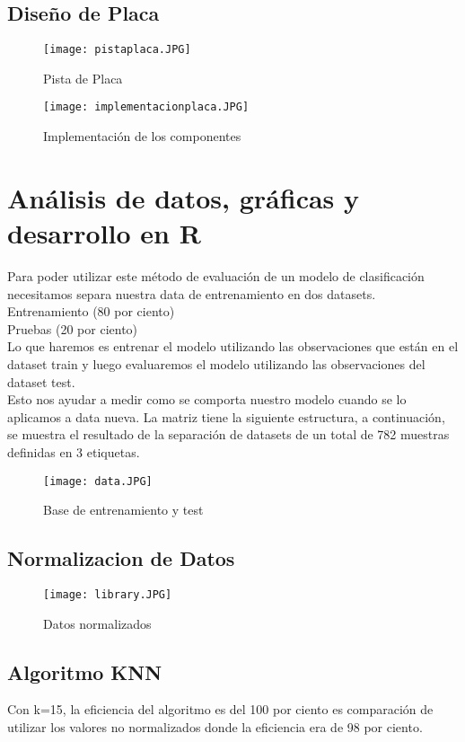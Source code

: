 \documentclass[10pt,a4paper]{article}
\begin{document}
\subsection{Diseño de Placa}

\begin{figure}[H]
\centering
\texttt{[image: pistaplaca.JPG]}
 \caption{Pista de Placa} 
\end{figure} 

\begin{figure}[H]
\centering
\texttt{[image: implementacionplaca.JPG]}
 \caption{Implementación de los componentes} 
\end{figure} 


\section{Análisis de datos, gráficas y desarrollo en R}

Para poder utilizar este método de evaluación de un modelo de clasificación necesitamos separa nuestra data de entrenamiento en dos datasets.\\
Entrenamiento (80 por ciento)\\
Pruebas (20 por ciento)\\
Lo que haremos es entrenar el modelo utilizando las observaciones que están en el dataset train y luego evaluaremos el modelo utilizando las observaciones del dataset test.\\
Esto nos ayudar a medir como se comporta nuestro modelo cuando se lo aplicamos a data nueva. La matriz tiene la siguiente estructura, a continuación, se muestra el resultado de la separación de datasets de un total de 782 muestras definidas en 3 etiquetas.

\begin{figure}[H]
\centering
\texttt{[image: data.JPG]}
 \caption{Base de entrenamiento y test} 
\end{figure} 


\subsection{Normalizacion de Datos }

\begin{figure}[H]
\centering
\texttt{[image: library.JPG]}
 \caption{Datos normalizados} 
\end{figure} 

\subsection{Algoritmo KNN}
Con k=15, la eficiencia del algoritmo es del 100 por ciento es comparación de utilizar los valores no normalizados donde la eficiencia era de 98 por ciento.
\end{document}
